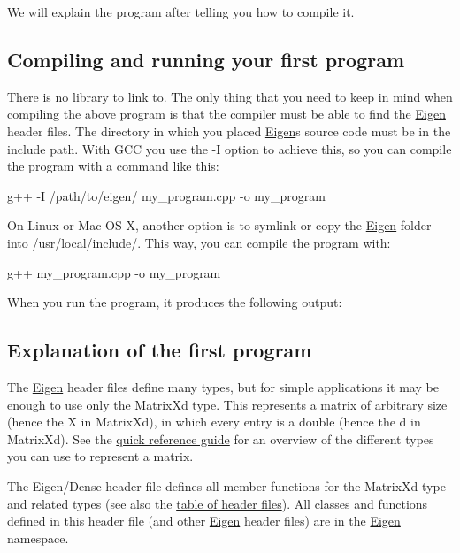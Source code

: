 We will explain the program after telling you how to compile it.\hypertarget{_getting_started_GettingStartedCompiling}{}\subsection{Compiling and running your first program}\label{_getting_started_GettingStartedCompiling}
There is no library to link to. The only thing that you need to keep in mind when compiling the above program is that the compiler must be able to find the \hyperlink{namespace_eigen}{Eigen} header files. The directory in which you placed \hyperlink{namespace_eigen}{Eigen}\textquotesingle{}s source code must be in the include path. With G\+CC you use the -\/I option to achieve this, so you can compile the program with a command like this\+:


\begin{DoxyCode}
g++ -I /path/to/eigen/ my\_program.cpp -o my\_program 
\end{DoxyCode}


On Linux or Mac OS X, another option is to symlink or copy the \hyperlink{namespace_eigen}{Eigen} folder into /usr/local/include/. This way, you can compile the program with\+:


\begin{DoxyCode}
g++ my\_program.cpp -o my\_program 
\end{DoxyCode}


When you run the program, it produces the following output\+:


\begin{DoxyCodeInclude}
\end{DoxyCodeInclude}
\hypertarget{_getting_started_GettingStartedExplanation}{}\subsection{Explanation of the first program}\label{_getting_started_GettingStartedExplanation}
The \hyperlink{namespace_eigen}{Eigen} header files define many types, but for simple applications it may be enough to use only the {\ttfamily Matrix\+Xd} type. This represents a matrix of arbitrary size (hence the {\ttfamily X} in {\ttfamily Matrix\+Xd}), in which every entry is a {\ttfamily double} (hence the {\ttfamily d} in {\ttfamily Matrix\+Xd}). See the \hyperlink{QuickReference.dox_QuickRef_Types}{quick reference guide} for an overview of the different types you can use to represent a matrix.

The {\ttfamily Eigen/\+Dense} header file defines all member functions for the Matrix\+Xd type and related types (see also the \hyperlink{QuickReference.dox_QuickRef_Headers}{table of header files}). All classes and functions defined in this header file (and other \hyperlink{namespace_eigen}{Eigen} header files) are in the {\ttfamily \hyperlink{namespace_eigen}{Eigen}} namespace.

